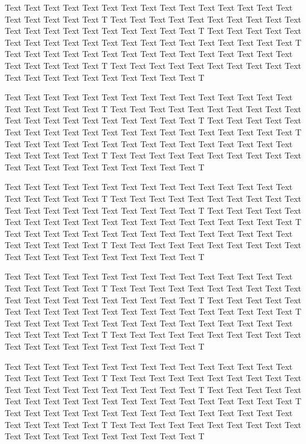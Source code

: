 \documentclass{bioinfo}
\begin{document}
Text Text Text Text Text Text  Text Text Text Text Text Text Text Text Text  Text Text Text Text Text T
Text Text Text Text Text Text  Text Text Text Text Text Text Text Text Text  Text Text Text Text Text T
Text Text Text Text Text Text  Text Text Text Text Text Text Text Text Text  Text Text Text Text Text T
Text Text Text Text Text Text  Text Text Text Text Text Text Text Text Text  Text Text Text Text Text T
Text Text Text Text Text Text  Text Text Text Text Text Text Text Text Text  Text Text Text Text Text T

Text Text Text Text Text Text  Text Text Text Text Text Text Text Text Text  Text Text Text Text Text T
Text Text Text Text Text Text  Text Text Text Text Text Text Text Text Text  Text Text Text Text Text T
Text Text Text Text Text Text  Text Text Text Text Text Text Text Text Text  Text Text Text Text Text T
Text Text Text Text Text Text  Text Text Text Text Text Text Text Text Text  Text Text Text Text Text T
Text Text Text Text Text Text  Text Text Text Text Text Text Text Text Text  Text Text Text Text Text T

Text Text Text Text Text Text  Text Text Text Text Text Text Text Text Text  Text Text Text Text Text T
Text Text Text Text Text Text  Text Text Text Text Text Text Text Text Text  Text Text Text Text Text T
Text Text Text Text Text Text  Text Text Text Text Text Text Text Text Text  Text Text Text Text Text T
Text Text Text Text Text Text  Text Text Text Text Text Text Text Text Text  Text Text Text Text Text T
Text Text Text Text Text Text  Text Text Text Text Text Text Text Text Text  Text Text Text Text Text T

Text Text Text Text Text Text  Text Text Text Text Text Text Text Text Text  Text Text Text Text Text T
Text Text Text Text Text Text  Text Text Text Text Text Text Text Text Text  Text Text Text Text Text T
Text Text Text Text Text Text  Text Text Text Text Text Text Text Text Text  Text Text Text Text Text T
Text Text Text Text Text Text  Text Text Text Text Text Text Text Text Text  Text Text Text Text Text T
Text Text Text Text Text Text  Text Text Text Text Text Text Text Text Text  Text Text Text Text Text T

Text Text Text Text Text Text  Text Text Text Text Text Text Text Text Text  Text Text Text Text Text T
Text Text Text Text Text Text  Text Text Text Text Text Text Text Text Text  Text Text Text Text Text T
Text Text Text Text Text Text  Text Text Text Text Text Text Text Text Text  Text Text Text Text Text T
Text Text Text Text Text Text  Text Text Text Text Text Text Text Text Text  Text Text Text Text Text T
Text Text Text Text Text Text  Text Text Text Text Text Text Text Text Text  Text Text Text Text Text T
\end{document}
